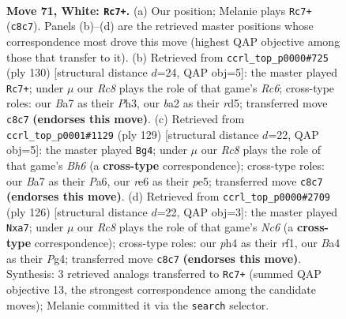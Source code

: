 \documentclass[11pt]{article}
\begin{document}
\clearpage

\begin{figure}[p]\centering
\begin{subfigure}{0.46\textwidth}\centering
\resizebox{\linewidth}{!}{%
\newchessgame
\chessboard[
  setfen={2R5/B5k1/4r3/8/B3p2p/5p1P/b4P2/5K2 w - - 52 71},
  showmover=false,
  pgfstyle=straightmove, color=movearrow, markmove={c8-c7}
]}
\caption{}
\end{subfigure}\hfill
\begin{subfigure}{0.46\textwidth}\centering
\resizebox{\linewidth}{!}{%
\newchessgame
\chessboard[
  setfen={8/5k2/2R5/3rp1p1/6Pp/7P/5PK1/8 w - - 1 66},
  showmover=false,
  pgfstyle=straightmove, color=movearrow, markmove={c6-c7}
]}
\caption{}
\end{subfigure}
\\[4pt]
\begin{subfigure}{0.46\textwidth}\centering
\resizebox{\linewidth}{!}{%
\newchessgame
\chessboard[
  setfen={3K4/7p/p1k4P/1p2P3/1P6/P1B4b/8/8 b - - 0 65},
  showmover=false,
  pgfstyle=straightmove, color=movearrow, markmove={h3-g4}
]}
\caption{}
\end{subfigure}\hfill
\begin{subfigure}{0.46\textwidth}\centering
\resizebox{\linewidth}{!}{%
\newchessgame
\chessboard[
  setfen={4k3/bPB5/2N2p2/3p2p1/6P1/1KP5/8/5r2 w - - 19 64},
  showmover=false,
  pgfstyle=straightmove, color=movearrow, markmove={c6-a7}
]}
\caption{}
\end{subfigure}
\caption{\textbf{Move 71, White: \texttt{Rc7+}.} (a) Our position; Melanie plays \texttt{Rc7+} (\texttt{c8c7}). Panels (b)--(d) are the retrieved master positions whose correspondence most drove this move (highest QAP objective among those that transfer to it). (b) Retrieved from \texttt{ccrl\_top\_p0000\#725} (ply 130) [structural distance $d$=24, QAP obj=5]: the master played \texttt{Rc7+}; under $\mu$ our \emph{Rc8} plays the role of that game's \emph{Rc6}; cross-type roles: our \emph{B}a7 as their \emph{P}h3, our \emph{b}a2 as their \emph{r}d5; transferred move \texttt{c8c7} \textbf{(endorses this move)}. (c) Retrieved from \texttt{ccrl\_top\_p0001\#1129} (ply 129) [structural distance $d$=22, QAP obj=5]: the master played \texttt{Bg4}; under $\mu$ our \emph{Rc8} plays the role of that game's \emph{Bh6} (a \textbf{cross-type} correspondence); cross-type roles: our \emph{B}a7 as their \emph{P}a6, our \emph{r}e6 as their \emph{p}e5; transferred move \texttt{c8c7} \textbf{(endorses this move)}. (d) Retrieved from \texttt{ccrl\_top\_p0000\#2709} (ply 126) [structural distance $d$=22, QAP obj=3]: the master played \texttt{Nxa7}; under $\mu$ our \emph{Rc8} plays the role of that game's \emph{Nc6} (a \textbf{cross-type} correspondence); cross-type roles: our \emph{p}h4 as their \emph{r}f1, our \emph{B}a4 as their \emph{P}g4; transferred move \texttt{c8c7} \textbf{(endorses this move)}. Synthesis: 3 retrieved analogs transferred to \texttt{Rc7+} (summed QAP objective 13, the strongest correspondence among the candidate moves); Melanie committed it via the \texttt{search} selector.}
\label{fig:thought-m140}
\end{figure}
\end{document}
